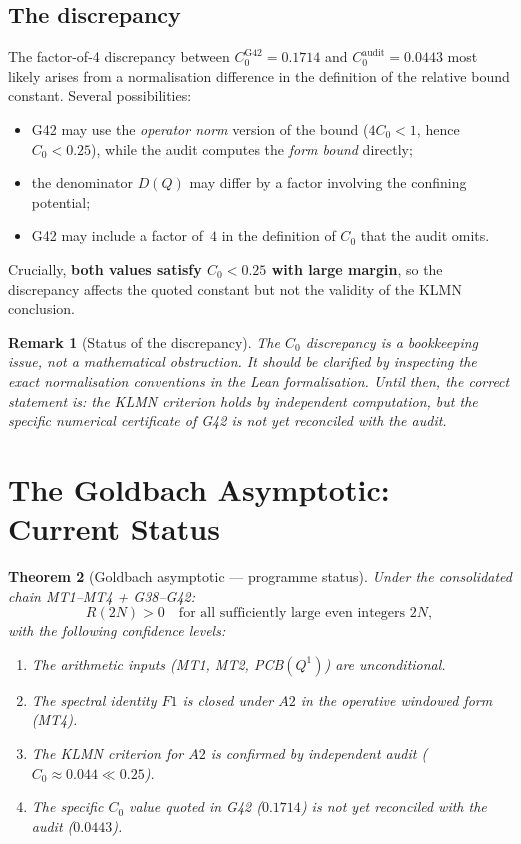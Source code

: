 \documentclass[11pt,a4paper]{article}
\newtheorem{theorem}{Theorem}[section]
\newtheorem{remark}[theorem]{Remark}
\begin{document}
\subsection{The discrepancy}

The factor-of-4 discrepancy between $C_0^{\text{G42}}=0.1714$ and $C_0^{\text{audit}}=0.0443$ most likely arises from a normalisation difference in the definition of the relative bound constant.  Several possibilities:
\begin{itemize}[nosep]
    \item G42 may use the \emph{operator norm} version of the bound ($4C_0<1$, hence $C_0<0.25$), while the audit computes the \emph{form bound} directly;
    \item the denominator $D(Q)$ may differ by a factor involving the confining potential;
    \item G42 may include a factor of~$4$ in the definition of $C_0$ that the audit omits.
\end{itemize}
Crucially, \textbf{both values satisfy $C_0<0.25$ with large margin}, so the discrepancy affects the quoted constant but not the validity of the KLMN conclusion.

\begin{remark}[Status of the discrepancy]
The $C_0$ discrepancy is a bookkeeping issue, not a mathematical obstruction.  It should be clarified by inspecting the exact normalisation conventions in the Lean formalisation.  Until then, the correct statement is: the KLMN criterion holds by independent computation, but the specific numerical certificate of G42 is not yet reconciled with the audit.
\end{remark}

\section{The Goldbach Asymptotic: Current Status}

\begin{theorem}[Goldbach asymptotic --- programme status]
\label{thm:goldbach-status}
Under the consolidated chain MT1--MT4 + G38--G42:
\[
R(2N)>0 \quad\text{for all sufficiently large even integers } 2N,
\]
with the following confidence levels:
\begin{enumerate}[nosep]
    \item The arithmetic inputs (MT1, MT2, PCB$(Q^1)$) are unconditional.
    \item The spectral identity $F1$ is closed under $A2$ in the operative windowed form (MT4).
    \item The KLMN criterion for $A2$ is confirmed by independent audit ($C_0\approx 0.044 \ll 0.25$).
    \item The specific $C_0$ value quoted in G42 ($0.1714$) is not yet reconciled with the audit ($0.0443$).
\end{enumerate}
\end{theorem}
\end{document}
